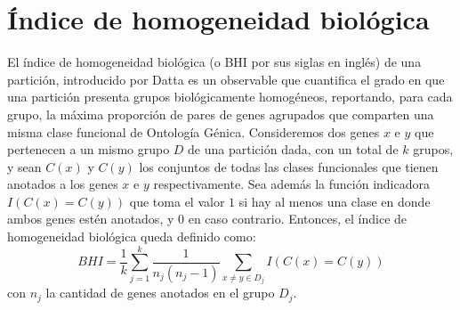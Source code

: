 \section{Índice de homogeneidad biológica}
El índice de homogeneidad biológica (o BHI por sus siglas en inglés) de una partición, introducido por Datta \cite{Datta2006} es un observable que cuantifica el grado en que una partición presenta grupos biológicamente homogéneos, reportando, para cada grupo, la máxima proporción de pares de genes agrupados que comparten una misma clase funcional de Ontología Génica. Consideremos dos genes $x$ e $y$ que pertenecen a un mismo grupo $D$ de una partición dada, con un total de $k$ grupos, y sean $C(x)$ y $C(y)$ los conjuntos de todas las clases funcionales que tienen anotados a los genes $x$ e $y$ respectivamente. Sea además la función indicadora $I(C(x)=C(y))$ que toma el valor $1$ si hay al menos una clase en donde ambos genes estén anotados, y $0$ en caso contrario. Entonces, el índice de homogeneidad biológica queda definido como:
\begin{equation}
	BHI = \frac{1}{k}\sum\limits_{j=1}^k\frac{1}{n_j(n_j-1)}\sum\limits_{x\neq y\in D_j}I(C(x)=C(y))
\end{equation}
con $n_j$ la cantidad de genes anotados en el grupo $D_j$.\\

